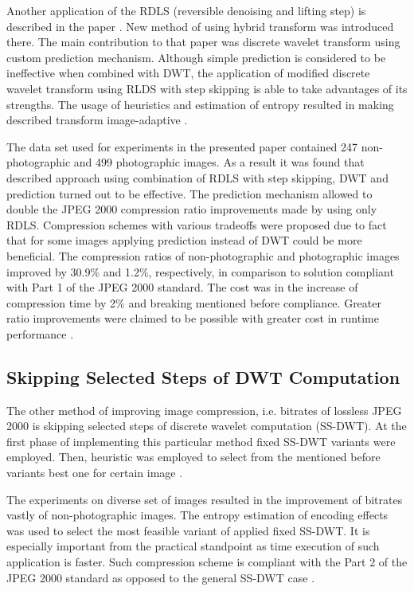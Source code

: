 Another application of the RDLS (reversible denoising and lifting step) is described
in the paper \cite{entropy}. New method of using hybrid transform was introduced there.
The main contribution to that paper was discrete wavelet transform using custom prediction
mechanism. Although simple prediction is considered to be ineffective when combined with DWT,
the application of modified discrete wavelet transform using RLDS with step skipping is able to
take advantages of its strengths. The usage of heuristics and estimation of entropy resulted
in making described transform image-adaptive \cite{entropy}.

The data set used for experiments in the presented paper contained 247 non-photographic and
499 photographic images. As a result it was found that described approach using combination
of RDLS with step skipping, DWT and prediction turned out to be effective. The prediction
mechanism allowed to double the JPEG 2000 compression ratio improvements made by using only RDLS.
Compression schemes with various tradeoffs were proposed due to fact that for some images
applying prediction instead of DWT could be more beneficial. The compression ratios of non-photographic
and photographic images improved by 30.9\% and 1.2\%, respectively, in comparison to solution
compliant with Part 1 of the JPEG 2000 standard. The cost was in the increase of compression
time by 2\% and breaking mentioned before compliance. Greater ratio improvements were claimed to
be possible with greater cost in runtime performance \cite{entropy}.

\subsection{Skipping Selected Steps of DWT Computation}

The other method of improving image compression, i.e. bitrates of lossless JPEG 2000 is skipping
selected steps of discrete wavelet computation (SS-DWT). At the first phase of implementing
this particular method fixed SS-DWT variants were employed. Then, heuristic was employed to select
from the mentioned before variants best one for certain image \cite{skipping_dwt}.

The experiments on diverse set of images resulted in the improvement of bitrates vastly of
non-photographic images. The entropy estimation of encoding effects was used to select the most
feasible variant of applied fixed SS-DWT. It is especially important from the practical standpoint
as time execution of such application is faster. Such compression scheme is compliant with the Part 2
of the JPEG 2000 standard as opposed to the general SS-DWT case \cite{skipping_dwt}.

